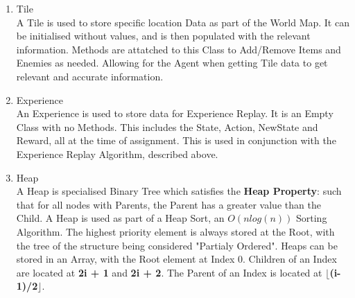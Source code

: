 \begin{flushleft}
\begin{enumerate}
                \vspace{0.5cm}
                \item {\Large Tile} \\
                A Tile is used to store specific location Data as part of the World Map. It can be initialised without values, and is
                then populated with the relevant information. Methods are attatched to this Class to Add/Remove Items and Enemies as needed.
                Allowing for the Agent when getting Tile data to get relevant and accurate information.

                \vspace{0.5cm}
                \item {\Large Experience} \\
                An Experience is used to store data for Experience Replay. It is an Empty Class with no Methods. This includes the State, 
                Action, NewState and Reward, all at the time of assignment. This is used in conjunction with the Experience Replay 
                Algorithm, described above.

                \vspace{0.5cm}
                \item {\Large Heap} \\
                A Heap is specialised Binary Tree which satisfies the \textbf{Heap Property}: such that for all nodes with Parents, the
                Parent has a greater value than the Child. A Heap is used as part of a Heap Sort, an $O(nlog(n))$ Sorting Algorithm. The
                highest priority element is always stored at the Root, with the tree of the structure being considered "Partialy Ordered".
                Heaps can be stored in an Array, with the Root element at Index 0. Children of an Index are located at \textbf{2i + 1} and
                \textbf{2i + 2}. The Parent of an Index is located at \textbf{$\lfloor$(i-1)/2$\rfloor$}.
            \end{enumerate}

        \vspace{0.5cm}

\end{flushleft}
